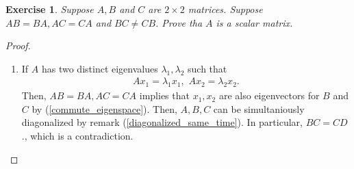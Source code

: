 \documentclass[11pt]{book}
\newtheorem{exercise}{Exercise}[section]
\theoremstyle{definition}
\numberwithin{equation}{subsection}
\begin{document}
\begin{exercise}{\bf *}
Suppose $A, B$ and $C$ are $2 \times 2$ matrices. Suppose $AB = BA, AC = CA$ and $BC \neq CB$. Prove tha $A$ is a scalar matrix.
\end{exercise}
\begin{proof}
~\begin{enumerate}[label=(\alph*)]
    \item If $A$ has two distinct eigenvalues $\lambda_1, \lambda_2$ such that
    \begin{align*}
        A x_1 = \lambda_1 x_1, \,\, A x_2 = \lambda_2 x_2.
    \end{align*}
    Then, $AB = BA, AC = CA$ implies that $x_1, x_2$ are also eigenvectors for $B$ and $C$ by (\ref{commute_eigenspace}). Then, $A, B, C$ can be simultaniously diagonalized by remark (\ref{diagonalized_same_time}). In particular, $BC = CD$., which is a contradiction.
    

\end{enumerate}
\end{proof}
\end{document}
